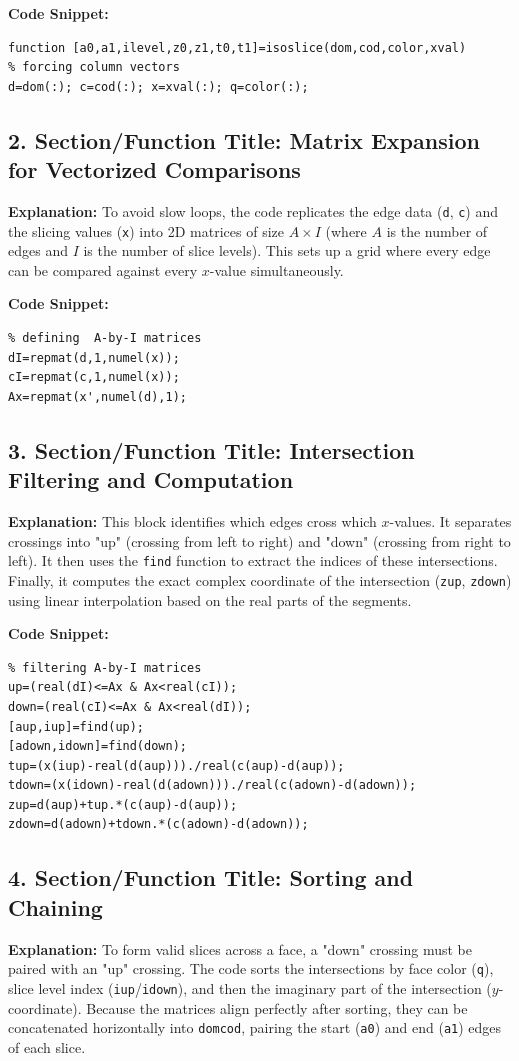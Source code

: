 \textbf{Code Snippet:}
\begin{lstlisting}
function [a0,a1,ilevel,z0,z1,t0,t1]=isoslice(dom,cod,color,xval)
% forcing column vectors
d=dom(:); c=cod(:); x=xval(:); q=color(:);
\end{lstlisting}

\subsection*{2. Section/Function Title: Matrix Expansion for Vectorized Comparisons}
\textbf{Explanation:} To avoid slow loops, the code replicates the edge data (\texttt{d}, \texttt{c}) and the slicing values (\texttt{x}) into 2D matrices of size $A \times I$ (where $A$ is the number of edges and $I$ is the number of slice levels). This sets up a grid where every edge can be compared against every $x$-value simultaneously.

\textbf{Code Snippet:}
\begin{lstlisting}
% defining  A-by-I matrices
dI=repmat(d,1,numel(x));
cI=repmat(c,1,numel(x));
Ax=repmat(x',numel(d),1);
\end{lstlisting}

\subsection*{3. Section/Function Title: Intersection Filtering and Computation}
\textbf{Explanation:} This block identifies which edges cross which $x$-values. It separates crossings into "up" (crossing from left to right) and "down" (crossing from right to left). It then uses the \texttt{find} function to extract the indices of these intersections. Finally, it computes the exact complex coordinate of the intersection (\texttt{zup}, \texttt{zdown}) using linear interpolation based on the real parts of the segments.

\textbf{Code Snippet:}
\begin{lstlisting}
% filtering A-by-I matrices
up=(real(dI)<=Ax & Ax<real(cI));
down=(real(cI)<=Ax & Ax<real(dI));
[aup,iup]=find(up);
[adown,idown]=find(down);
tup=(x(iup)-real(d(aup)))./real(c(aup)-d(aup));
tdown=(x(idown)-real(d(adown)))./real(c(adown)-d(adown));
zup=d(aup)+tup.*(c(aup)-d(aup));
zdown=d(adown)+tdown.*(c(adown)-d(adown));
\end{lstlisting}

\subsection*{4. Section/Function Title: Sorting and Chaining}
\textbf{Explanation:} To form valid slices across a face, a "down" crossing must be paired with an "up" crossing. The code sorts the intersections by face color (\texttt{q}), slice level index (\texttt{iup}/\texttt{idown}), and then the imaginary part of the intersection ($y$-coordinate). Because the matrices align perfectly after sorting, they can be concatenated horizontally into \texttt{domcod}, pairing the start (\texttt{a0}) and end (\texttt{a1}) edges of each slice.


